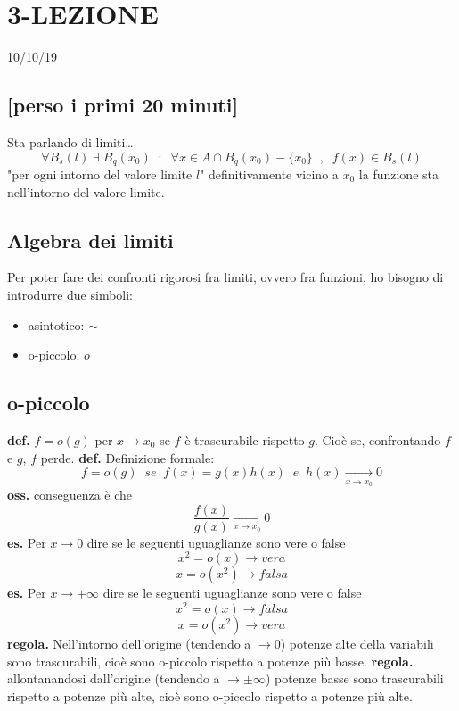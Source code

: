 \section*{3-LEZIONE}
10/10/19
\subsection*{[perso i primi 20 minuti]}
Sta parlando di limiti\dots
\newline
\[
    \forall B_s(l) \;\exists\; B_q(x_0) \;\;:\;\; \forall x\in A \cap B_q(x_0)-\{x_0\} \;\;,\;\;f(x) \in B_s(l)
\]
"per ogni intorno del valore limite $l$" definitivamente vicino a $x_0$ la funzione sta nell'intorno del valore limite.
\subsection*{Algebra dei limiti}
Per poter fare dei confronti rigorosi fra limiti, ovvero fra funzioni, ho bisogno di introdurre due simboli:
\begin{itemize}
    \item asintotico: $\sim$
    \item o-piccolo: $o$
\end{itemize}
\subsection*{o-piccolo}
\textbf{def.} $f = o(g)$ per $x \rightarrow x_0$ se $f$ è trascurabile rispetto $g$. Cioè se, confrontando $f$ e $g$, $f$ perde.
\newline
\newline
\textbf{def.} Definizione formale:
\[
    f = o(g) \;\; se \;\; f(x) = g(x)h(x) \;\; e \;\; h(x) \xrightarrow[x\rightarrow x_0] \; 0
\]
\textbf{oss.} conseguenza è che
\[
    \frac{f(x)}{g(x)}\xrightarrow[x\rightarrow x_0] \; 0
\]
\newline
\textbf{es.} Per $x\longrightarrow 0$ dire se le seguenti uguaglianze sono vere o false
\[
    x^2 = o(x) \rightarrow vera
\]
\[
    x=o(x^2) \rightarrow falsa
\]
\textbf{es.} Per $x\longrightarrow +\infty$ dire se le seguenti uguaglianze sono vere o false
\[
    x^2 = o(x) \rightarrow  falsa
\]
\[
    x=o(x^2) \rightarrow  vera
\]
\newline
\textbf{regola.} Nell'intorno dell'origine (tendendo a $\rightarrow  0$) potenze alte della variabili sono trascurabili, cioè sono o-piccolo rispetto a potenze più basse.
\newline
\textbf{regola.} allontanandosi dall'origine (tendendo a $\rightarrow \pm \infty$)  potenze basse sono trascurabili rispetto a potenze più alte, cioè sono o-piccolo rispetto a potenze più alte.
\newline
